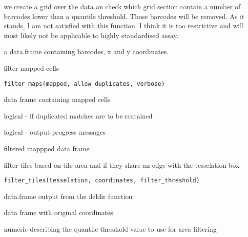 \documentclass[a4paper]{book}
\begin{document}
%
\begin{Details}
we create a grid over the data an check which grid section contain
a number of barcodes lower than a quantile threshold. Those barcodes will 
be removed. As it stands, I am not satisfied with this function. I think 
it is too restrictive and will most likely not be applicable to highly 
standardised assay.
\end{Details}
%
\begin{Value}
a data.frame containing barcodes, x and y coordinates.
\end{Value}
%
\begin{Description}
filter mapped cells
\end{Description}
%
\begin{Usage}
\begin{verbatim}
filter_maps(mapped, allow_duplicates, verbose)
\end{verbatim}
\end{Usage}
%
\begin{Arguments}
\begin{ldescription}
\item[\code{mapped}] data frame containing mapped cells

\item[\code{allow\_duplicates}] logical - if duplicated matches are to be reatained

\item[\code{verbose}] logical - output progress messages
\end{ldescription}
\end{Arguments}
%
\begin{Value}
filtered mappped data frame
\end{Value}
%
\begin{Description}
filter tiles based on tile area and if they share an edge with the 
tesselation box
\end{Description}
%
\begin{Usage}
\begin{verbatim}
filter_tiles(tesselation, coordinates, filter_threshold)
\end{verbatim}
\end{Usage}
%
\begin{Arguments}
\begin{ldescription}
\item[\code{tesselation}] data.frame output from the deldir function

\item[\code{coordinates}] data frame with original coordinates

\item[\code{filter\_threshold}] numeric describing the quantile threshold value
to use for area filtering
\end{ldescription}
\end{Arguments}
\end{document}
